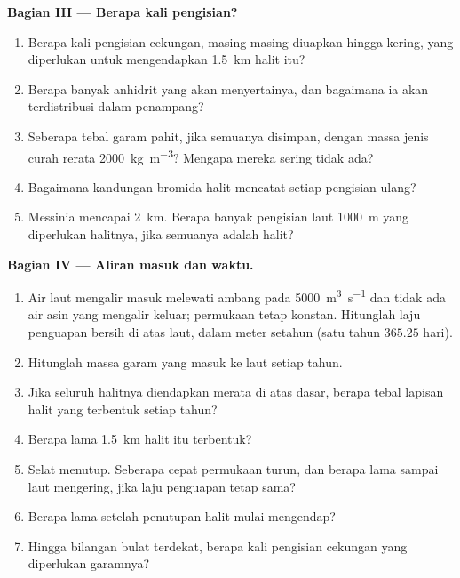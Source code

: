 \begin{problem}
\noindent\textbf{Bagian III --- Berapa kali pengisian?}
\begin{enumerate}[resume]
  \item Berapa kali pengisian cekungan, masing-masing diuapkan hingga kering, yang diperlukan untuk mengendapkan \qty{1.5}{km} halit itu?
  \item Berapa banyak anhidrit yang akan menyertainya, dan bagaimana ia akan terdistribusi dalam penampang?
  \item Seberapa tebal garam pahit, jika semuanya disimpan, dengan massa jenis curah rerata \qty{2000}{kg.m^{-3}}? Mengapa mereka sering tidak ada?
  \item Bagaimana kandungan bromida halit mencatat setiap pengisian ulang?
  \item {} Messinia mencapai \qty{2}{km}. Berapa banyak pengisian laut \qty{1000}{m} yang diperlukan halitnya, jika semuanya adalah halit?
\end{enumerate}

\noindent\textbf{Bagian IV --- Aliran masuk dan waktu.}
\begin{enumerate}[resume]
  \item Air laut mengalir masuk melewati ambang pada \qty{5000}{m^3.s^{-1}} dan tidak ada air asin yang mengalir keluar; permukaan tetap konstan. Hitunglah laju penguapan bersih di atas laut, dalam meter setahun (satu tahun $365.25$ hari).
  \item Hitunglah massa garam yang masuk ke laut setiap tahun.
  \item Jika seluruh halitnya diendapkan merata di atas dasar, berapa tebal lapisan halit yang terbentuk setiap tahun?
  \item Berapa lama \qty{1.5}{km} halit itu terbentuk?
  \item Selat menutup. Seberapa cepat permukaan turun, dan berapa lama sampai laut mengering, jika laju penguapan tetap sama?
  \item Berapa lama setelah penutupan halit mulai mengendap?
  \item Hingga bilangan bulat terdekat, berapa kali pengisian cekungan yang diperlukan garamnya?
\end{enumerate}
\end{problem}
